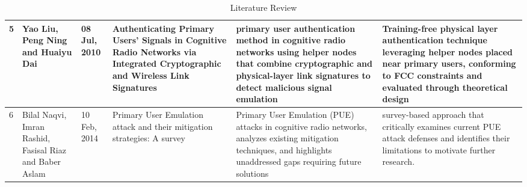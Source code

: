\begin{table}[]
\begin{tabular}{|p{0.5cm}|p{2.5cm}|p{1.0cm}|p{3.2cm}|p{2.9cm}|p{2.8cm}|}
\hline
5 & Yao Liu, Peng Ning and Huaiyu Dai & 08 Jul, 2010 & Authenticating Primary Users' Signals in Cognitive Radio Networks via Integrated Cryptographic and Wireless Link Signatures & primary user authentication method in cognitive radio networks using helper nodes that combine cryptographic and physical-layer link signatures to detect malicious signal emulation & Training-free physical layer authentication technique leveraging helper nodes placed near primary users, conforming to FCC constraints and evaluated through theoretical design \\
\hline
6 & Bilal Naqvi, Imran Rashid, Fasisal Riaz and Baber Aslam & 10 Feb, 2014 & Primary User Emulation attack and their mitigation strategies: A survey &  Primary User Emulation (PUE) attacks in cognitive radio networks, analyzes existing mitigation techniques, and highlights unaddressed gaps requiring future solutions & survey-based approach that critically examines current PUE attack defenses and identifies their limitations to motivate further research.\\

\hline

\end{tabular}
    \caption{Literature Review}
    \label{tab:LR_view1}
\end{table}

